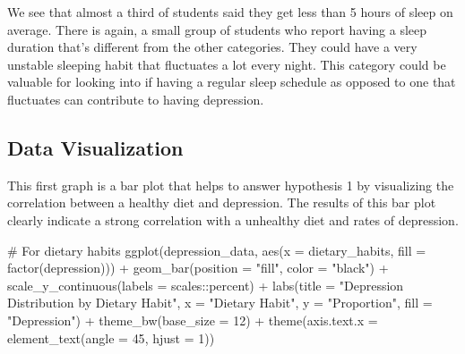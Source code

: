 \documentclass[
  letterpaper,
  DIV=11,
  numbers=noendperiod]{scrartcl}
\newenvironment{Shaded}{\begin{snugshade}}{\end{snugshade}}
\newcommand{\AttributeTok}[1]{\textcolor[rgb]{0.40,0.45,0.13}{#1}}
\newcommand{\CommentTok}[1]{\textcolor[rgb]{0.37,0.37,0.37}{#1}}
\newcommand{\DecValTok}[1]{\textcolor[rgb]{0.68,0.00,0.00}{#1}}
\newcommand{\FunctionTok}[1]{\textcolor[rgb]{0.28,0.35,0.67}{#1}}
\newcommand{\NormalTok}[1]{\textcolor[rgb]{0.00,0.23,0.31}{#1}}
\newcommand{\SpecialCharTok}[1]{\textcolor[rgb]{0.37,0.37,0.37}{#1}}
\newcommand{\StringTok}[1]{\textcolor[rgb]{0.13,0.47,0.30}{#1}}
\begin{document}
We see that almost a third of students said they get less than 5 hours
of sleep on average. There is again, a small group of students who
report having a sleep duration that's different from the other
categories. They could have a very unstable sleeping habit that
fluctuates a lot every night. This category could be valuable for
looking into if having a regular sleep schedule as opposed to one that
fluctuates can contribute to having depression.

\subsection{Data Visualization}\label{data-visualization}

This first graph is a bar plot that helps to answer hypothesis 1 by
visualizing the correlation between a healthy diet and depression. The
results of this bar plot clearly indicate a strong correlation with a
unhealthy diet and rates of depression.

\begin{Shaded}
\begin{Highlighting}[numbers=left,,]
\CommentTok{\# For dietary habits}
\FunctionTok{ggplot}\NormalTok{(depression\_data, }\FunctionTok{aes}\NormalTok{(}\AttributeTok{x =}\NormalTok{ dietary\_habits, }\AttributeTok{fill =} \FunctionTok{factor}\NormalTok{(depression))) }\SpecialCharTok{+}
  \FunctionTok{geom\_bar}\NormalTok{(}\AttributeTok{position =} \StringTok{"fill"}\NormalTok{, }\AttributeTok{color =} \StringTok{"black"}\NormalTok{) }\SpecialCharTok{+}
  \FunctionTok{scale\_y\_continuous}\NormalTok{(}\AttributeTok{labels =}\NormalTok{ scales}\SpecialCharTok{::}\NormalTok{percent) }\SpecialCharTok{+}
  \FunctionTok{labs}\NormalTok{(}\AttributeTok{title =} \StringTok{"Depression Distribution by Dietary Habit"}\NormalTok{,}
       \AttributeTok{x =} \StringTok{"Dietary Habit"}\NormalTok{, }\AttributeTok{y =} \StringTok{"Proportion"}\NormalTok{,}
       \AttributeTok{fill =} \StringTok{"Depression"}\NormalTok{) }\SpecialCharTok{+}
  \FunctionTok{theme\_bw}\NormalTok{(}\AttributeTok{base\_size =} \DecValTok{12}\NormalTok{) }\SpecialCharTok{+}
  \FunctionTok{theme}\NormalTok{(}\AttributeTok{axis.text.x =} \FunctionTok{element\_text}\NormalTok{(}\AttributeTok{angle =} \DecValTok{45}\NormalTok{, }\AttributeTok{hjust =} \DecValTok{1}\NormalTok{))}
\end{Highlighting}
\end{Shaded}
\end{document}
